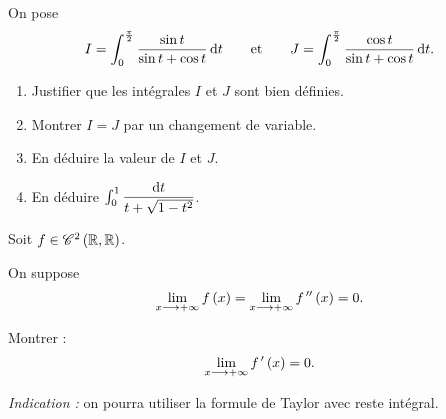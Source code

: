 \begin{corr}
\end{corr}

\begin{exo}
On pose \[I=\int_0^{\frac{\pi}{2}}\dfrac{\sin t}{\sin t+\cos t}\odif{t}\qquad\text{et}\qquad J=\int_0^{\frac{\pi}{2}}\dfrac{\cos t}{\sin t+\cos t}\odif{t}.\]

\begin{enumerate}
\item Justifier que les intégrales \(I\) et \(J\) sont bien définies. \\

\item Montrer \(I=J\) par un changement de variable. \\

\item En déduire la valeur de \(I\) et \(J\). \\

\item En déduire \(\int_0^1\dfrac{\odif{t}}{t+\sqrt{1-t^2}}\).
\end{enumerate}
\end{exo}

\begin{corr}
\end{corr}

\begin{exo}
Soit \(f\in\mathscr{C}^{2}\left(\mathbb{R},\mathbb{R}\right)\).

On suppose \[\lim_{x\longrightarrow+\infty}f\left(x\right)=\lim_{x\longrightarrow+\infty}f^{\,\prime\prime}\left(x\right)=0.\]

Montrer : \[\lim_{x\longrightarrow+\infty}f^{\,\prime}\left(x\right)=0.\]

\textit{Indication :} on pourra utiliser la formule de Taylor avec reste intégral.
\end{exo}

\begin{corr}
\end{corr}

